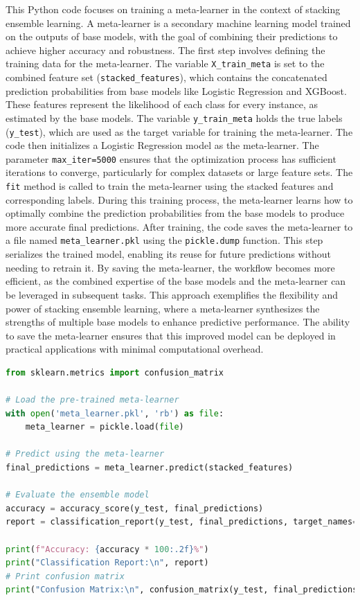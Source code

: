 \noindent
This Python code focuses on training a meta-learner in the context of stacking ensemble learning. A meta-learner is a secondary machine learning model trained on the outputs of base models, with the goal of combining their predictions to achieve higher accuracy and robustness. The first step involves defining the training data for the meta-learner. The variable \texttt{X\_train\_meta} is set to the combined feature set (\texttt{stacked\_features}), which contains the concatenated prediction probabilities from base models like Logistic Regression and XGBoost. These features represent the likelihood of each class for every instance, as estimated by the base models. The variable \texttt{y\_train\_meta} holds the true labels (\texttt{y\_test}), which are used as the target variable for training the meta-learner. The code then initializes a Logistic Regression model as the meta-learner. The parameter \texttt{max\_iter=5000} ensures that the optimization process has sufficient iterations to converge, particularly for complex datasets or large feature sets. The \texttt{fit} method is called to train the meta-learner using the stacked features and corresponding labels. During this training process, the meta-learner learns how to optimally combine the prediction probabilities from the base models to produce more accurate final predictions. After training, the code saves the meta-learner to a file named \texttt{meta\_learner.pkl} using the \texttt{pickle.dump} function. This step serializes the trained model, enabling its reuse for future predictions without needing to retrain it. By saving the meta-learner, the workflow becomes more efficient, as the combined expertise of the base models and the meta-learner can be leveraged in subsequent tasks. This approach exemplifies the flexibility and power of stacking ensemble learning, where a meta-learner synthesizes the strengths of multiple base models to enhance predictive performance. The ability to save the meta-learner ensures that this improved model can be deployed in practical applications with minimal computational overhead.
    

\begin{tcolorbox}[colback=gray!5!white, colframe=gray!80!black, boxrule=0.5pt, title=Ensemble Model 1 : Evaluate Meta-Learner and Ensemble Model]
\begin{lstlisting}[language=Python]
from sklearn.metrics import confusion_matrix

# Load the pre-trained meta-learner
with open('meta_learner.pkl', 'rb') as file:
    meta_learner = pickle.load(file)

# Predict using the meta-learner
final_predictions = meta_learner.predict(stacked_features)

# Evaluate the ensemble model
accuracy = accuracy_score(y_test, final_predictions)
report = classification_report(y_test, final_predictions, target_names=label_encoder.classes_)

print(f"Accuracy: {accuracy * 100:.2f}%")
print("Classification Report:\n", report)
# Print confusion matrix
print("Confusion Matrix:\n", confusion_matrix(y_test, final_predictions))
\end{lstlisting}
\end{tcolorbox}

